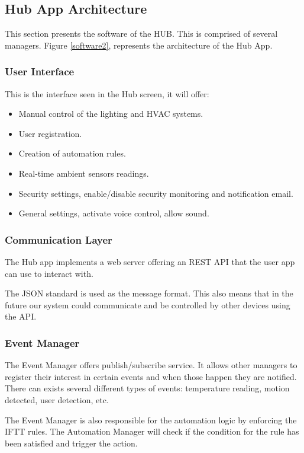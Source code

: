 \subsection{Hub App Architecture}

This section presents the software of the HUB. This is comprised of several managers. Figure \ref{software2}, represents the architecture of the Hub App.

\subsubsection{User Interface}
This is the interface seen in the Hub screen, it will offer:

\begin{itemize}
  \item Manual control of the lighting and HVAC systems.
  \item User registration.
  \item Creation of automation rules.
  \item Real-time ambient sensors readings.
  \item Security settings, enable/disable security monitoring and notification email.
  \item General settings, activate voice control, allow sound.
   
\end{itemize}

\subsubsection{Communication Layer}

The Hub app implements a web server offering an \ac{REST} \ac{API} that the user app can use to interact with. 

The \ac{JSON} standard is used as the message format. This also means that in the future our system could communicate and be controlled by other devices using the \ac{API}.

\subsubsection{Event Manager}
The Event Manager offers publish/subscribe service. It allows other managers to register their interest in certain events and when those happen they are notified. There can exists several different types of events: temperature reading, motion detected, user detection, etc.

The Event Manager is also responsible for the automation logic by enforcing the \ac{IFTT} rules. The Automation Manager will check if the condition for the rule has been satisfied and trigger the action. 

